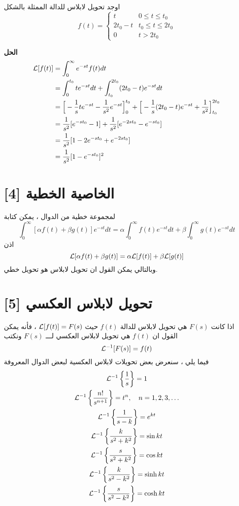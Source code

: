 \begin{example}
	اوجد تحويل لابلاس للدالة الممثلة بالشكل
	\[
	f(t) = 
	\begin{cases}
		t & 0 \leq t \leq t_0 \\
		2t_0 - t & t_0 \leq t \leq 2t_0\\
		0 & t > 2t_0
	\end{cases} 
	\]
\end{example}
\noindent
\textbf{الحل}
\begin{align*}
	\mathcal{L}[f(t)] &= \int_{0}^{\infty} e^{-st} f(t)dt\\
	&= \int_{0}^{t_0} te^{-st}dt + \int_{t_0}^{2t_0} (2t_0 - t)e^{-st}dt\\
	&= \Big[-\frac{1}{s} te^{-st} - \frac{1}{s^2} e^{-st}\Big]^{t_0}_0  + \Big[- \frac{1}{s}(2t_0 - t)e^{-st} + \frac{1}{s^2} \Big]^{2t_0}_{t_0}\\
	&= \frac{1}{s^2}[e^{-st_0} -1] + \frac{1}{s^2} [e^{-2st_0} - e^{-st_0}]\\
	&= \frac{1}{s^2} [ 1-2e^{-st_0} + e^{-2st_0}]\\
	&= \frac{1}{s^2} [1-e^{-st_0}]^2 
\end{align*}

\newpage
\section{الخاصية الخطية [4]}
لمجموعة خطية من الدوال ، يمكن كتابة 
\begin{equation}
\int_{0}^{\infty} [\alpha f(t) + \beta g(t)] e^{-st} dt = \alpha \int_{0}^{\infty}  f(t)e^{-st} dt + \beta \int_{0}^{\infty} g(t) e^{-st} dt
 \end{equation}
 اذن
 \begin{equation}
 	\mathcal{L}[\alpha f(t) + \beta g(t)] = \alpha \mathcal{L}[f(t)] + \beta \mathcal{L}[g(t)]
 \end{equation}
 وبالتالي يمكن القول ان تحويل لابلاس هو تحويل خطي.
 
 \section{تحويل لابلاس العكسي [5]} 
 اذا كانت $F(s)$ هي تحويل لابلاس للدالة $f(t)$ حيث $\mathcal{L}[f(t)] = F(s)$ ، فأنه يمكن القول ان $f(t)$ هي تحويل لابلاس العكسي لـــ $F(s)$ ونكتب 
\begin{equation}
	 \mathcal{L}^{-1} [F(s)] = f(t)
\end{equation}
 فيما يلي ، سنعرض بعض تحويلات لابلاس العكسية لبعض الدوال المعروفة
 \begin{gather}
 	\mathcal{L}^{-1} \left\{\frac{1}{s}\right\} = 1\\
 	\mathcal{L}^{-1}\left\{ \frac{n!}{s^{n+1}}\right\} = t^n , \quad n=1,2,3,\dots\\
 	\mathcal{L}^{-1}\left\{\frac{1}{s-k}\right\} = e^{kt}\\
 	\mathcal{L}^{-1}\left\{\frac{k}{s^2 + k^2}\right\} = \sin kt\\
 	\mathcal{L}^{-1}\left\{\frac{s}{s^2 + k^2}\right\} = \cos kt\\
 	\mathcal{L}^{-1}\left\{\frac{k}{s^2 - k^2}\right\} = \sinh kt\\
 	\mathcal{L}^{-1}\left\{\frac{s}{s^2 - k^2}\right\} = \cosh kt
 \end{gather}
 
